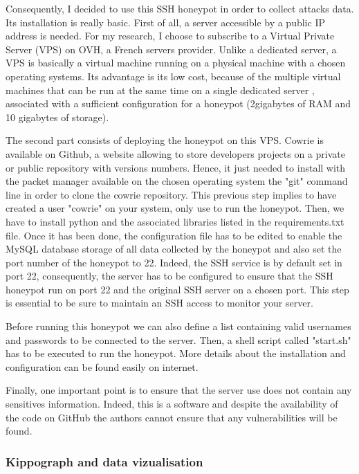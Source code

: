 Consequently, I decided to use this SSH honeypot in order to collect attacks data. Its 
installation is really basic. First of all, a server accessible by a public IP address is 
needed. For my research, I choose to subscribe to a Virtual Private Server (VPS) on OVH, a French
servers provider. Unlike a dedicated server, a VPS is basically a virtual machine running on a
physical machine with a chosen operating systems. Its advantage is its low cost, because of
the multiple virtual machines that can be run at the same time on a single dedicated server
, associated with a sufficient configuration for a honeypot (2gigabytes of RAM and 10 
gigabytes of storage).

The second part consists of deploying the honeypot on this VPS. Cowrie is available on Github,
a website allowing to store developers projects on a private or public repository with versions
numbers. Hence, it just needed to install with the packet manager available on the chosen 
operating system the "git" command line in order to clone the cowrie repository. This previous
step implies to have created a user "cowrie" on your system, only use to run the honeypot.
Then, we have to install python and the associated libraries listed in the requirements.txt
file.
Once it has been done, the configuration file has to be edited to enable the MySQL database
storage of all data collected by the honeypot and also set the port number of the honeypot to
22. Indeed, the SSH service is by default set in port 22, consequently, the server has to be 
configured to ensure that the SSH honeypot run on port 22 and the original SSH server on a chosen
port. This step is essential to be sure to maintain an SSH access to monitor your server.

Before running this honeypot we can also define a list containing valid usernames and 
passwords to be connected to the server. Then, a shell script called "start.sh" has
to be executed to run the honeypot. More details about the installation and configuration
can be found easily on internet.

Finally, one important point is to ensure that the server use does not contain any sensitives
information. Indeed, this is a software and despite the availability of the code on
GitHub the authors cannot ensure that any vulnerabilities will be found.


\subsubsection{Kippograph and data vizualisation} %

